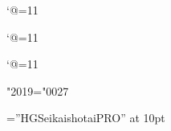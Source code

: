 \catcode`@=11\relax
\let\EA=\expandafter
\let\CS=\csname
\let\EC=\endcsname
\def\KoAkuma{Rules}%
\def\Obsolete{N}%


\catcode`@=11\relax
\global\let\LD@meaning@Saved\meaning

\catcode`@=11\relax
{}%


\lccode"2019="0027\relax%



%

\font\LD@Font@Kana=''HGSeikaishotaiPRO'' at 10pt
\LD@Font@Kana



\def\LD@Akuma@Language{fr}%


\LD@Kanjidic@Load


\LD@Yomigana@Kanji@Preprocessing
\LD@Yomigana@Preprocessing@Default


